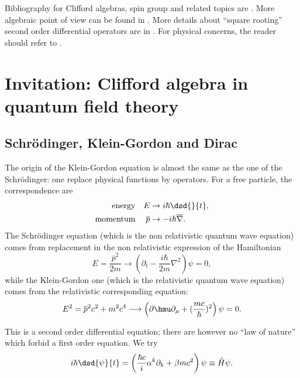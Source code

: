 
Bibliography for Clifford algebras, spin group and related topics are \cite{memP,Michelson,Witkowski,mellor,ResEtaDiracType}. More algebraic point of view  can be found in \cite{Fult,Chevalley}. More details about ``square rooting'' second order differential operators are in \cite{Bronn}. For physical concerns, the reader should refer to \cite{Weinberg,Peskin,schwabl}.

\section{Invitation: Clifford algebra in quantum field theory}

\label{Secqft}
\subsection{Schrödinger, Klein-Gordon and Dirac}

The origin of the Klein-Gordon equation is almost the same as the one of the Schrödinger: one replace physical functions by operators. For a free particle, the correspondence are
\begin{align*}
	\textrm{energy}   &  & E            & \rightarrow i\hbar\dsd{}{t},            \\
	\textrm{momentum} &  & \overline{p} & \rightarrow -i\hbar\overline{ \nabla }.
\end{align*}
The Schrödinger equation (which is the non relativistic quantum wave equation) comes from replacement in the non relativistic expression of the Hamiltonian
\[
	E=\frac{\overline{p}^2}{2m}\longrightarrow\left(\partial_t-\frac{i\hbar}{2m}\nabla^2\right)\psi=0,
\]
while the Klein-Gordon one (which is the relativistic quantum wave equation) comes from the relativistic corresponding equation:
\[
	E^2=\overline{p}^2c^2+m^2c^4\longrightarrow\left(\partial\hmu\partial_{\mu}+(\frac{mc}{\hbar})^2\right)\psi=0.
\]

This is a second order differential equation; there are however no ``law of nature''{} which forbid a first order equation. We try
\[
	i\hbar\dsd{\psi}{t}
	=\left(\frac{\hbar c}{i}\alpha^k\partial_k+\beta mc^2\right)\psi\equiv \hat{H}\psi.
\]

